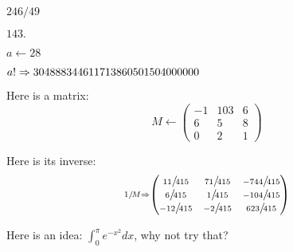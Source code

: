 \documentclass[11pt]{article}
\renewcommand{\frac}[2]{{\scriptstyle #1}/\!{\scriptstyle #2}}
\begin{document}
\( %
\frac{246}{49} \)

\( 143. \)

$ %
a \gets 28 $

$a! \Rightarrow 304888344611713860501504000000 $

Here is a matrix:
\begin{displaymath}
M \gets \begin{pmatrix} -1 & 103 & 6 \\ 6 & 5 & 8 \\ 0 & 2 & 1 \end{pmatrix}
\end{displaymath}

Here is its inverse:
\begin{displaymath}
\evalto \frac{1}{M} \to \begin{pmatrix} \frac{11}{415} & 
 \frac{71}{415} & \frac{-744}{415} \\ \frac{6}{415} & 
 \frac{1}{415} & \frac{-104}{415} \\ \frac{-12}{415} & 
 \frac{-2}{415} & \frac{623}{415} \end{pmatrix}
\end{displaymath}

Here is an idea: $\int_0^\pi e^{-x^2} dx$, why not try that?
\end{document}

